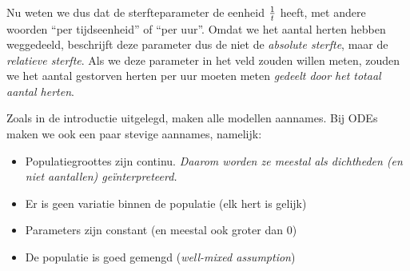 \documentclass[
  a4paper,
]{scrbook}
\providecommand{\tightlist}{%
  \setlength{\itemsep}{0pt}\setlength{\parskip}{0pt}}\usepackage{longtable,booktabs,array}
\theoremstyle{definition}
\theoremstyle{remark}
\begin{document}
Nu weten we dus dat de sterfteparameter de eenheid \(1 \over t\) heeft,
met andere woorden ``per tijdseenheid'' of ``per uur''. Omdat we het
aantal herten hebben weggedeeld, beschrijft deze parameter dus de niet
de \emph{absolute sterfte}, maar de \emph{relatieve sterfte}. Als we
deze parameter in het veld zouden willen meten, zouden we het aantal
gestorven herten per uur moeten meten \emph{gedeelt door het totaal
aantal herten}.

\begin{tcolorbox}[enhanced jigsaw, coltitle=black, breakable, bottomtitle=1mm, opacityback=0, colback=white, rightrule=.15mm, title=\textcolor{quarto-callout-tip-color}{\faLightbulb}\hspace{0.5em}{ODEs doen belangrijke aannames}, bottomrule=.15mm, toprule=.15mm, left=2mm, colframe=quarto-callout-tip-color-frame, toptitle=1mm, opacitybacktitle=0.6, titlerule=0mm, colbacktitle=quarto-callout-tip-color!10!white, leftrule=.75mm, arc=.35mm]

Zoals in de introductie uitgelegd, maken alle modellen aannames. Bij
ODEs maken we ook een paar stevige aannames, namelijk:

\begin{itemize}
\tightlist
\item
  Populatiegroottes zijn continu. \emph{Daarom worden ze meestal als
  dichtheden (en niet aantallen) geïnterpreteerd. }
\item
  Er is geen variatie binnen de populatie (elk hert is gelijk)
\item
  Parameters zijn constant (en meestal ook groter dan \(0\))
\item
  De populatie is goed gemengd (\emph{well-mixed assumption})
\end{itemize}

\end{tcolorbox}
\end{document}
